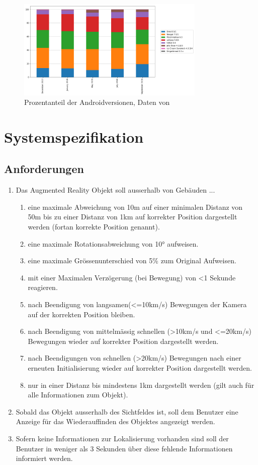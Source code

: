 \documentclass[a4paper]{scrreprt}
\begin{document}
\begin{figure}
	\centering
	\includegraphics[keepaspectratio,width=0.8\textwidth]{AndroidMarketshare}
	\caption{Prozentanteil der Androidversionen, Daten von \cite{Fossbytes2018}}
	\label{fig:AndroidMarketshare}
\end{figure}


\newpage
\section{Systemspezifikation}
\label{sec:SysSpec}

\subsection{Anforderungen}
\begin{enumerate}
	\item Das Augmented Reality Objekt soll ausserhalb von Gebäuden ...
	\begin{enumerate}[label*=\arabic*.]
		\item eine maximale Abweichung von 10m auf einer minimalen Distanz von 50m bis zu einer Distanz von 1km auf korrekter Position dargestellt werden (fortan korrekte Position genannt).
		\item eine maximale Rotationsabweichung von \ang{10} aufweisen.
		\item eine maximale Grössenunterschied von 5\% zum Original Aufweisen.
		\item mit einer Maximalen Verzögerung (bei Bewegung) von <1 Sekunde reagieren.
		\item nach Beendigung von langsamen(<=10km/s) Bewegungen der Kamera auf der korrekten Position bleiben.
		\item nach Beendigung von mittelmässig schnellen (>10km/s und <=20km/s) Bewegungen wieder auf korrekter Position dargestellt werden.
		\item nach Beendigungen von schnellen (>20km/s) Bewegungen nach einer erneuten Initialisierung wieder auf korrekter Position dargestellt werden.
		\item nur in einer Distanz bis mindestens 1km dargestellt werden (gilt auch für alle Informationen zum Objekt).
	\end{enumerate}
	\item Sobald das Objekt ausserhalb des Sichtfeldes ist, soll dem Benutzer eine Anzeige für das Wiederauffinden des Objektes angezeigt werden.
	\item Sofern keine Informationen zur Lokalisierung vorhanden sind soll der Benutzer in weniger als 3 Sekunden über diese fehlende Informationen informiert werden.
\end{enumerate}
\end{document}
